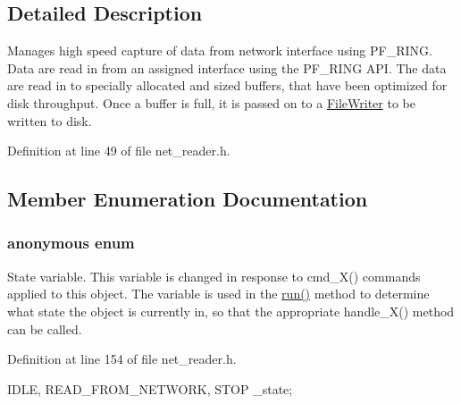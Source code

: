 \subsection{Detailed Description}
Manages high speed capture of data from network interface using PF\_\-RING. Data are read in from an assigned interface using the PF\_\-RING API. The data are read in to specially allocated and sized buffers, that have been optimized for disk throughput. Once a buffer is full, it is passed on to a \hyperlink{class_file_writer}{FileWriter} to be written to disk. 

Definition at line 49 of file net\_\-reader.h.



\subsection{Member Enumeration Documentation}
\hypertarget{class_net_reader_ab7f953c3d9d89435f05ba1674fd868c9}{
\subsubsection[{"@320}]{\setlength{\rightskip}{0pt plus 5cm}anonymous enum}}
\label{class_net_reader_ab7f953c3d9d89435f05ba1674fd868c9}
State variable. This variable is changed in response to cmd\_\-X() commands applied to this object. The variable is used in the \hyperlink{class_net_reader_af770f94a75655fc02489c9cb1f778181}{run()} method to determine what state the object is currently in, so that the appropriate handle\_\-X() method can be called. 

Definition at line 154 of file net\_\-reader.h.


\begin{DoxyCode}
{ IDLE, READ_FROM_NETWORK, STOP } _state;
\end{DoxyCode}


